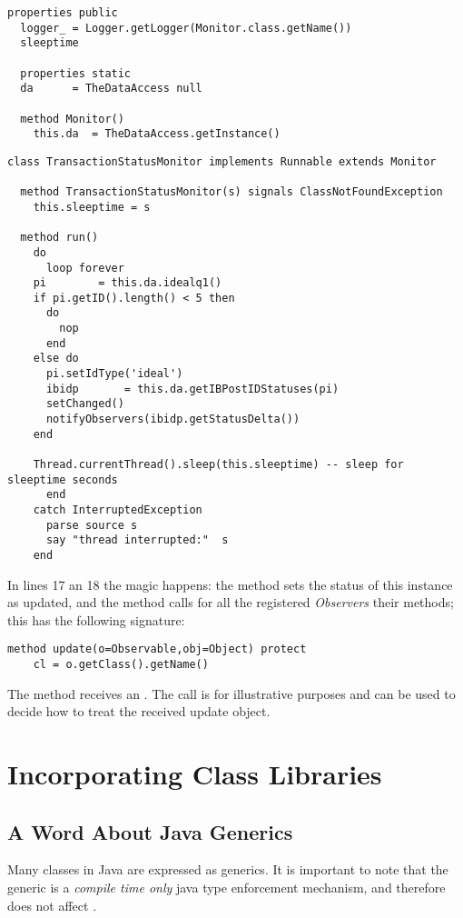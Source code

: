 {\begin{lstlisting}[label=obs4,caption=The Monitor Superclass]
  properties public
  logger_ = Logger.getLogger(Monitor.class.getName())
  sleeptime

  properties static
  da	  = TheDataAccess null
  
  method Monitor()
    this.da  = TheDataAccess.getInstance()
\end{lstlisting}

\begin{lstlisting}[label=obs3,caption=an Observable Thread]
class TransactionStatusMonitor implements Runnable extends Monitor
  
  method TransactionStatusMonitor(s) signals ClassNotFoundException
    this.sleeptime = s
    
  method run()
    do
      loop forever
	pi		  = this.da.idealq1()
	if pi.getID().length() < 5 then
	  do
	    nop
	  end
	else do
	  pi.setIdType('ideal')
	  ibidp		  = this.da.getIBPostIDStatuses(pi)
	  setChanged()
	  notifyObservers(ibidp.getStatusDelta())
	end
	
	Thread.currentThread().sleep(this.sleeptime) -- sleep for sleeptime seconds
      end
    catch InterruptedException
      parse source s
      say "thread interrupted:"  s
    end

\end{lstlisting}
In lines 17 an 18 the magic happens: the  method
sets the status of this instance as updated, and the
 method calls for all the registered
\emph{Observers} their  methods; this has the following
signature:

\begin{lstlisting}[label=obs4,caption=the update() method]
  method update(o=Observable,obj=Object) protect
    cl = o.getClass().getName()
\end{lstlisting}
The  method receives an . The
 call is for illustrative purposes and can be
used to decide how to treat the received update object.



\chapter{Incorporating Class Libraries}
\section{A Word About Java Generics}
Many classes in Java are expressed as generics. It is important to note that the generic is a \emph{compile time only} java type 
enforcement mechanism, and therefore does not affect \nr{}.

}
